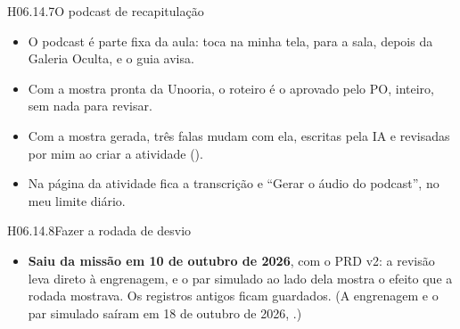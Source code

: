 \begin{historia}{H06.14.7}{O podcast de recapitulação}{\parcial}
\aceite
\begin{itemize}
  \item O podcast é parte fixa da aula: toca na minha tela, para a sala,
    depois da Galeria Oculta, e o guia avisa.
  \item Com a mostra pronta da Unooria, o roteiro é o aprovado pelo PO,
    inteiro, sem nada para revisar.
  \item Com a mostra gerada, três falas mudam com ela, escritas pela IA e
    revisadas por mim ao criar a atividade ().
  \item Na página da atividade fica a transcrição e \enquote{Gerar o áudio
    do podcast}, no meu limite diário.
\end{itemize}
\end{historia}

\begin{historia}{H06.14.8}{Fazer a rodada de desvio}{\arquivada}
\aceite
\begin{itemize}
  \item \textbf{Saiu da missão em 10 de outubro de 2026}, com o PRD v2: a
    revisão leva direto à engrenagem, e o par simulado ao lado dela mostra o
    efeito que a rodada mostrava. Os registros antigos ficam guardados. (A
    engrenagem e o par simulado saíram em 18 de outubro de 2026, .)
\end{itemize}
\end{historia}

